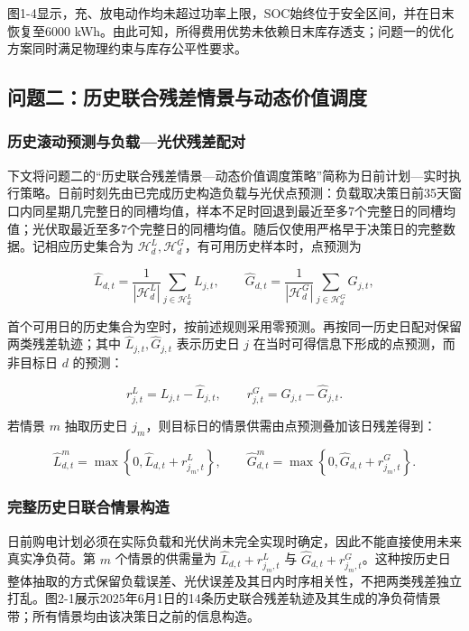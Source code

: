 \documentclass[zihao=-4,a4paper,UTF8,fontset=none]{ctexart}
\begin{document}
图1-4显示，充、放电动作均未超过功率上限，SOC始终位于安全区间，并在日末恢复至6000 kWh。由此可知，所得费用优势未依赖日末库存透支；问题一的优化方案同时满足物理约束与库存公平性要求。

\subsection{问题二：历史联合残差情景与动态价值调度}\label{ux95eeux9898ux4e8cux5386ux53f2ux8054ux5408ux6b8bux5deeux60c5ux666fux4e0eux52a8ux6001ux4ef7ux503cux8c03ux5ea6}

\subsubsection{历史滚动预测与负载---光伏残差配对}\label{ux5386ux53f2ux6edaux52a8ux9884ux6d4bux4e0eux8d1fux8f7dux5149ux4f0fux6b8bux5deeux914dux5bf9}

下文将问题二的``历史联合残差情景---动态价值调度策略''简称为日前计划---实时执行策略。日前时刻先由已完成历史构造负载与光伏点预测：负载取决策日前35天窗口内同星期几完整日的同槽均值，样本不足时回退到最近至多7个完整日的同槽均值；光伏取最近至多7个完整日的同槽均值。随后仅使用严格早于决策日的完整数据。记相应历史集合为 \(\mathcal H_d^L,\mathcal H_d^G\)，有可用历史样本时，点预测为

\[
\hat L_{d,t}=\frac{1}{|\mathcal H_d^L|}\sum_{j\in\mathcal H_d^L}L_{j,t},\qquad
\hat G_{d,t}=\frac{1}{|\mathcal H_d^G|}\sum_{j\in\mathcal H_d^G}G_{j,t},
\tag{5}
\]

首个可用日的历史集合为空时，按前述规则采用零预测。再按同一历史日配对保留两类残差轨迹；其中 \(\widehat L_{j,t},\widehat G_{j,t}\) 表示历史日 \(j\) 在当时可得信息下形成的点预测，而非目标日 \(d\) 的预测：

\[
r^L_{j,t}=L_{j,t}-\hat L_{j,t},\qquad r^G_{j,t}=G_{j,t}-\hat G_{j,t}.
\tag{5a}
\]

若情景 \(m\) 抽取历史日 \(j_m\)，则目标日的情景供需由点预测叠加该日残差得到：

\[
\widehat L^m_{d,t}=\max\!\left\{0,\widehat L_{d,t}+r^L_{j_m,t}\right\},\qquad
\widehat G^m_{d,t}=\max\!\left\{0,\widehat G_{d,t}+r^G_{j_m,t}\right\}.
\tag{5b}
\]

\subsubsection{完整历史日联合情景构造}\label{ux5b8cux6574ux5386ux53f2ux65e5ux8054ux5408ux60c5ux666fux6784ux9020}

日前购电计划必须在实际负载和光伏尚未完全实现时确定，因此不能直接使用未来真实净负荷。第 \(m\) 个情景的供需量为 \(\hat L_{d,t}+r^L_{j_m,t}\) 与 \(\hat G_{d,t}+r^G_{j_m,t}\)。这种按历史日整体抽取的方式保留负载误差、光伏误差及其日内时序相关性，不把两类残差独立打乱。图2-1展示2025年6月1日的14条历史联合残差轨迹及其生成的净负荷情景带；所有情景均由该决策日之前的信息构造。
\end{document}
